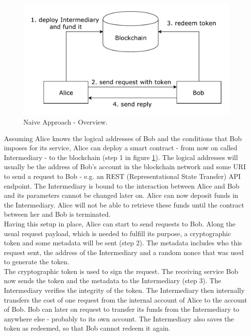 \documentclass[a4paper,12pt]{scrartcl}
\begin{document}
\begin{figure}[H]
\centering
\includegraphics[width=350pt]{Images/NaiveOverview.pdf}
\caption{Naive Approach - Overview.}
\label{fig:NaiveApproach}
\end{figure}

Assuming Alice knows the logical addresses of Bob and the conditions that Bob imposes for its service, Alice can deploy a smart contract - from now on called Intermediary - to the blockchain (step 1 in figure \ref{fig:NaiveApproach}). The logical addresses will usually be the address of Bob's account in the blockchain network and some URI to send a request to Bob - e.g. an REST (Representational State Transfer) \cite{fielding2000representational} API endpoint. The Intermediary is bound to the interaction between Alice and Bob and its parameters cannot be changed later on. Alice can now deposit funds in the Intermediary. Alice will not be able to retrieve these funds until the contract between her and Bob is terminated.\\

Having this setup in place, Alice can start to send requests to Bob. Along the usual request payload, which is needed to fulfill its purpose, a cryptographic token and some metadata will be sent (step 2). The metadata includes who this request sent, the address of the Intermediary and a random nonce that was used to generate the token.\\

The cryptographic token is used to sign the request. The receiving service Bob now sends the token and the metadata to the Intermediary (step 3). The Intermediary verifies the integrity of the token. The Intermediary then internally transfers the cost of one request from the internal account of Alice to the account of Bob. Bob can later on request to transfer its funds from the Intermediary to anywhere else - probably to its own account. The Intermediary also saves the token as redeemed, so that Bob cannot redeem it again.\\
\end{document}
